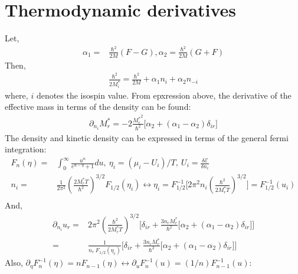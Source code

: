 \documentclass[preprint,prc,preprintnumbers,superscriptaddress,amsmath,amssymb,floatfix]{revtex4-1}
\begin{document}
\section{Thermodynamic derivatives}
Let,
\begin{equation}
 \begin{split}
  \alpha_1=&\frac{\hbar^2}{2M}(F-G), \alpha_2 =\frac{\hbar^2}{2M} (G+F)
  \end{split}
\end{equation}
Then,
\begin{equation}
 \begin{split}
  \frac{\hbar^2}{2 M^{*}_i}=\frac{\hbar^2}{2 M}+\alpha_1 n_i+\alpha_2 n_{-i}
 \end{split}
\end{equation}
where, $i$ denotes the isospin value. From epxression above, the derivative of the effective mass in terms of the density can be found:
\begin{equation}
 \begin{split}
  \partial_{n_i}M^{*}_r=-2\frac{{M_r^{*}}^2}{\hbar^2}\big[\alpha_2+(\alpha_1-\alpha_2)\delta_{ir}\big]
 \end{split}
\end{equation}
The density and kinetic density can be expressed in terms of the general fermi integration:
\begin{equation}
 \begin{split}
  F_n(\eta)=&\int_0^{\infty}\frac{u^n}{e^{u-\eta}+1}du,\ \eta_i=(\mu_i-U_i)/T,\  U_i=\frac{\delta \mathcal{E}}{\delta n_i}\\
  n_i=&\frac{1}{2\pi^2}(\frac{2M_r^{*}T}{\hbar^2})^{3/2}F_{1/2}(\eta_i)\leftrightarrow   \eta_i= F^{-1}_{1/2}\big[2 \pi^2 n_i(\frac{\hbar^2}{2 M_r^{*}T})^{3/2}\big]=F^{-1}_{1/2}(u_i)\\
 \end{split}
\end{equation}
And,
\begin{equation}
 \begin{split}
  \partial_{n_i}u_r=&2\pi^2(\frac{\hbar^2}{2 M_r^{*}T})^{3/2}\Big[\delta_{ir}+\frac{3 n_r M_r^{*}}{\hbar^2}\big[\alpha_2+(\alpha_1-\alpha_2)\delta_{ir}\big]\Big]\\
  =&\frac{1}{n_r\ F_{1/2}(\eta_r)}\Big[\delta_{ir}+\frac{3 n_r M_r^{*}}{\hbar^2}\big[\alpha_2+(\alpha_1-\alpha_2)\delta_{ir}\big]\Big]
 \end{split}
\end{equation}
Also, $\partial_{\eta}F^{-1}_n(\eta)=nF_{n-1}(\eta) \leftrightarrow \partial_{u}F^{-1}_n(u)=(1/n)F^{-1}_{n-1}(u)$:
\end{document}
